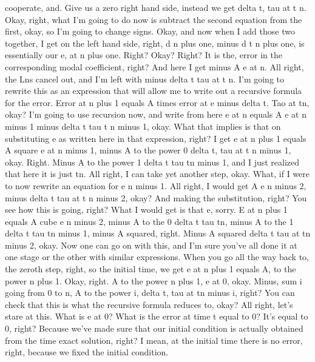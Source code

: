\documentclass[10pt]{article}
\begin{document}
cooperate, and. Give us a zero right hand side, instead we get delta t, tau at t n. Okay, right, what I'm going to do now is subtract the second equation from the first, okay, so I'm going to change signs. Okay, and now when I add those two together, I get on the left hand side, right, d n plus one, minus d t n plus one, is essentially our e, at n plus one. Right? Okay? Right? It is the, error in the corresponding modal coefficient, right? And here I get minus A e at n. All right, the Lns cancel out, and I'm left with minus delta t tau at t n. I'm going to rewrite this as an expression that will allow me to write out a recursive formula for the error. Error at n plus 1 equals A times error at e minus delta t. Tao at tn, okay? I'm going to use recursion now, and write from here e at n equals A e at n minus 1 minus delta t tau t n minus 1, okay. What that implies is that on substituting e as written here in that expression, right? I get e at n plus 1 equals A square e at n minus 1, minus A to the power 0 delta t, tau at t n minus 1, okay. Right. Minus A to the power 1 delta t tau tn minus 1, and I just realized that here it is just tn. All right, I can take yet another step, okay. What, if I were to now rewrite an equation for e n minus 1. All right, I would get A e n minus 2, minus delta t tau at t n minus 2, okay? And making the substitution, right? You see how this is going, right? What I would get is that e, sorry. E at n plus 1 equals A cube e n minus 2, minus A to the 0 delta t tau tn, minus A to the 1 delta t tau tn minus 1, minus A squared, right. Minus A squared delta t tau at tn minus 2, okay. Now one can go on with this, and I'm sure you've all done it at one stage or the other with similar expressions. When you go all the way back to, the zeroth step, right, so the initial time, we get e at n plus 1 equals A, to the power n plus 1. Okay, right. A to the power n plus 1, e at 0, okay. Minus, sum i going from 0 to n, A to the power i, delta t, tau at tn minus i, right? You can check that this is what the recursive formula reduces to, okay? All right, let's stare at this. What is e at 0? What is the error at time t equal to 0? It's equal to 0, right? Because we've made sure that our initial condition is actually obtained from the time exact solution, right? I mean, at the initial time there is no error, right, because we fixed the initial condition.
\end{document}
